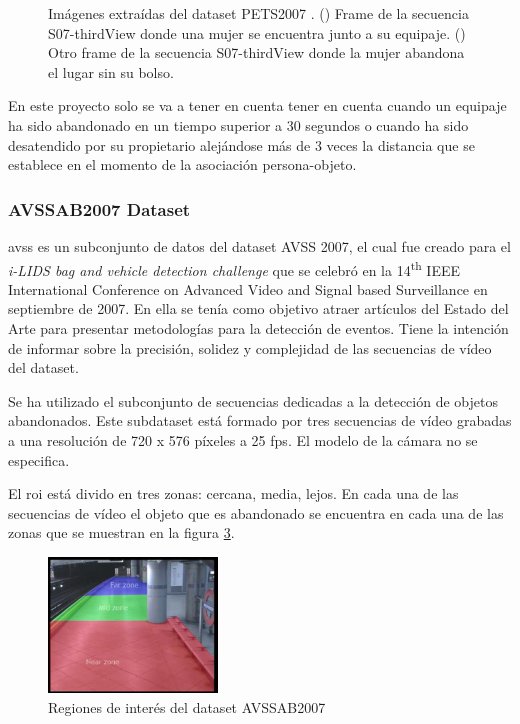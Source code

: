 \begin{figure}[ht]
\begin{subfigure}[b]{0.4\textwidth}
    \caption{}
    \label{fig:pets2007_4}
  \end{subfigure}
  \caption{Imágenes extraídas del dataset PETS2007 \cite{pets2007-dataset}.
    (\protect{}) Frame de la secuencia S07-thirdView donde una mujer se encuentra junto a su equipaje.
    (\protect{}) Otro frame de la secuencia S07-thirdView donde la mujer abandona el lugar sin su bolso.}
  \label{fig:pets2007_S07}
\end{figure}

En este proyecto solo se va a tener en cuenta tener en cuenta cuando un equipaje ha sido abandonado en un tiempo superior a 30 segundos o cuando ha sido desatendido por su propietario alejándose más de 3 veces la distancia que se establece en el momento de la asociación persona-objeto.

\subsubsection{AVSSAB2007 Dataset}

\gls{avss} es un subconjunto de datos del dataset AVSS 2007, el cual fue creado para el \textit{i-LIDS bag and vehicle detection challenge} que se celebró en la 14\textsuperscript{th} IEEE International Conference on Advanced Video and Signal based Surveillance en septiembre de 2007. En ella se tenía como objetivo atraer artículos del Estado del Arte para presentar metodologías para la detección de eventos. Tiene la intención de informar sobre la precisión, solidez y complejidad de las secuencias de vídeo del dataset.

Se ha utilizado el subconjunto de secuencias dedicadas a la detección de objetos abandonados. Este subdataset está formado por tres secuencias de vídeo grabadas a una resolución de 720 x 576 píxeles a 25 \gls{fps}. El modelo de la cámara no se especifica.

El \gls{roi} está divido en tres zonas: cercana, media, lejos. En cada una de las secuencias de vídeo el objeto que es abandonado se encuentra en cada una de las zonas que se muestran en la figura \ref{fig:avssab2007-zones}.

\begin{figure}[ht]
\centering
\includegraphics[width=0.4\textwidth]{img/chapters/resultados/datasets/avssab2007-zones.png}
\caption{\label{fig:avssab2007-zones}Regiones de interés del dataset AVSSAB2007}
\end{figure}

